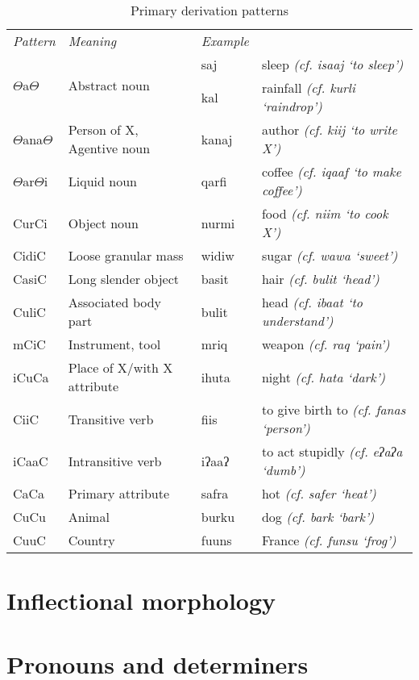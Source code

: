 \documentclass[a4paper,10pt,twoside,openright,draft]{memoir}
\newcommand{\rootpart}{$\Theta$}
\begin{document}
\begin{table}[ht]
    \centering
    \begin{tabular}{llll}
    \textit{Pattern} & \textit{Meaning} & \textit{Example} & \\
    \multirow{2}{*}{{\rootpart}a{\rootpart}} & \multirow{2}{*}{Abstract noun}& saj & sleep \emph{(cf. isaaj `to sleep')}\\
    & & kal & rainfall \emph{(cf. kurli `raindrop')}\\
    {\rootpart}ana{\rootpart} & Person of X, Agentive noun & kanaj & author \emph{(cf. kiij `to write X')}\\
    {\rootpart}ar{\rootpart}i & Liquid noun & qarfi & coffee \emph{(cf. iqaaf `to make coffee')} \\
    CurCi & Object noun & nurmi & food \emph{(cf. niim `to cook X')}\\
    CidiC & Loose granular mass & widiw & sugar \emph{(cf. wawa `sweet')} \\
    CasiC & Long slender object & basit & hair \emph{(cf. bulit `head')} \\
    CuliC & Associated body part & bulit & head \emph{(cf. ibaat `to understand')}\\
    mCiC & Instrument, tool & mriq & weapon \emph{(cf. raq `pain')} \\
    iCuCa & Place of X/with X attribute & ihuta & night \emph{(cf. hata `dark')} \\
    CiiC & Transitive verb & fiis & to give birth to \emph{(cf. fanas `person')} \\
    iCaaC & Intransitive verb & iʔaaʔ & to act stupidly \emph{(cf. eʔaʔa `dumb')} \\
    CaCa & Primary attribute & safra & hot \emph{(cf. safer `heat')} \\
    CuCu & Animal & burku & dog \emph{(cf. bark `bark')} \\
    CuuC & Country & fuuns & France \emph{(cf. funsu `frog')}
    
    \end{tabular}
    \caption{Primary derivation patterns}
    \label{tab:primedevs}
\end{table}

\section{Inflectional morphology}
\section{Pronouns and determiners}
\end{document}
